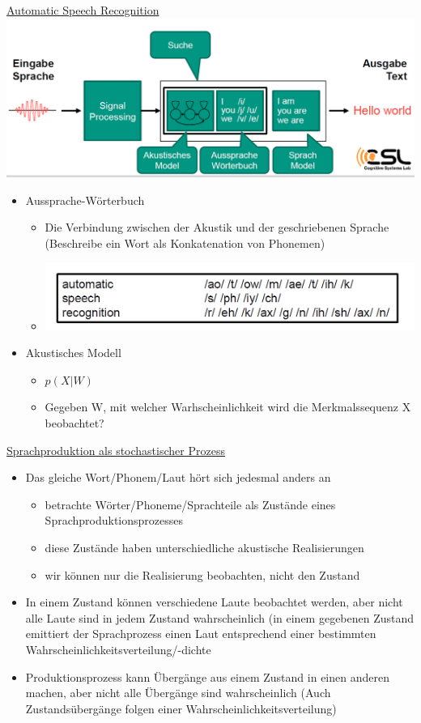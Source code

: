 \documentclass[a4paper,10pt,oneside]{article}
\begin{document}
\underline{Automatic Speech Recognition} \\
	\includegraphics[scale=0.15]{Grafiken/1333.png}
	\begin{itemize}
		\item Aussprache-Wörterbuch 
			\begin{itemize}
				\item Die Verbindung zwischen der Akustik und der geschriebenen Sprache (Beschreibe ein Wort als Konkatenation von Phonemen)
				\item[] \includegraphics[scale=0.2]{Grafiken/1335.png}
			\end{itemize}
		\item Akustisches Modell
			\begin{itemize}
				\item $p(X|W)$
				\item Gegeben W, mit welcher Warhscheinlichkeit wird die Merkmalssequenz X beobachtet?
			\end{itemize}
	\end{itemize}

\underline{Sprachproduktion als stochastischer Prozess} \\
	\begin{itemize}
		\item Das gleiche Wort/Phonem/Laut hört sich jedesmal anders an
			\begin{itemize}
				\item betrachte Wörter/Phoneme/Sprachteile als Zustände eines Sprachproduktionsprozesses
				\item diese Zustände haben unterschiedliche akustische Realisierungen
				\item wir können nur die Realisierung beobachten, nicht den Zustand
			\end{itemize}
		\item In einem Zustand können verschiedene Laute beobachtet werden, aber nicht alle Laute sind in jedem Zustand wahrscheinlich (in einem gegebenen Zustand emittiert der Sprachprozess einen Laut entsprechend einer bestimmten Wahrscheinlichkeitsverteilung/-dichte
		\item Produktionsprozess kann Übergänge aus einem Zustand in einen anderen machen, aber nicht alle Übergänge sind wahrscheinlich (Auch Zustandsübergänge folgen einer Wahrscheinlichkeitsverteilung)
	\end{itemize}
	
\end{document}
